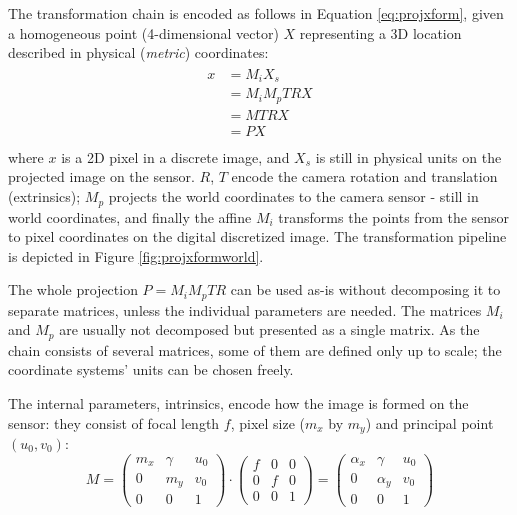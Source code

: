The transformation chain is encoded as follows in Equation \ref{eq:projxform}, given a homogeneous point (4-dimensional vector) $X$ representing a 3D location described in physical (\emph{metric}) coordinates:
\begin{align} \label{eq:projxform} \begin{split}
	x
	&= M_i X_s\\
	&= M_i M_p T R X\\
	&= M T R X\\
	&= P X\\
\end{split} \end{align}
where $x$ is a 2D pixel in a discrete image, and $X_s$ is still in physical units on the projected image on the sensor.
$R$, $T$ encode the camera rotation and translation (extrinsics);
$M_p$ projects the world coordinates to the camera sensor - still in world coordinates, and finally the affine $M_i$ transforms the points from the sensor to pixel coordinates on the digital discretized image.
The transformation pipeline is depicted in Figure \ref{fig:projxformworld}.



The whole projection $P = M_i M_p T R$ can be used as-is without decomposing it to separate matrices, unless the individual parameters are needed.
The matrices $M_i$ and $M_p$ are usually not decomposed but presented as a single matrix.
As the chain consists of several matrices, some of them are defined only up to scale; the coordinate systems' units can be chosen freely.


The internal parameters, intrinsics, encode how the image is formed on the sensor: they consist of focal length $f$, pixel size ($m_x$ by $m_y$) and principal point $(u_0, v_0)$:
\begin{equation}
	M =
	\begin{pmatrix}
		m_x & \gamma & u_0\\
		0   &    m_y & v_0\\
		0   &        0 & 1
	\end{pmatrix}
\cdot
	\begin{pmatrix}
		f & 0 & 0\\
		0 & f & 0\\
		0 & 0 & 1
	\end{pmatrix}
	=
	\begin{pmatrix}
		\alpha_x & \gamma   & u_0\\
		0        & \alpha_y & v_0\\
		0        & 0        & 1
	\end{pmatrix}
\end{equation}

